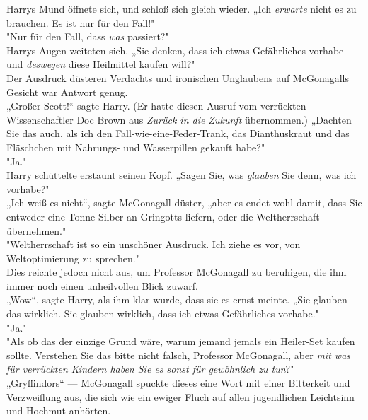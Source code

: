 {Harrys Mund öffnete sich, und schloß sich gleich wieder. „Ich \emph{erwarte} nicht es zu brauchen. Es ist nur für den Fall!"\\ "Nur für den Fall, dass \emph{was} passiert?"\\ Harrys Augen weiteten sich. „Sie denken, dass ich etwas Gefährliches vorhabe und \emph{deswegen} diese Heilmittel kaufen will?"\\ Der Ausdruck düsteren Verdachts und ironischen Unglaubens auf McGonagalls Gesicht war Antwort genug.\\ „Großer Scott!“ sagte Harry. (Er hatte diesen Ausruf vom verrückten Wissenschaftler Doc Brown aus \emph{Zurück in die Zukunft} übernommen.) „Dachten Sie das auch, als ich den Fall-wie-eine-Feder-Trank, das Dianthuskraut und das Fläschchen mit Nahrungs- und Wasserpillen gekauft habe?"\\ "Ja."\\ Harry schüttelte erstaunt seinen Kopf. „Sagen Sie, was \emph{glauben} Sie denn, was ich vorhabe?"\\ „Ich weiß es nicht“, sagte McGonagall düster, „aber es endet wohl damit, dass Sie entweder eine Tonne Silber an Gringotts liefern, oder die Weltherrschaft übernehmen."\\ "Weltherrschaft ist so ein unschöner Ausdruck. Ich ziehe es vor, von Weltoptimierung zu sprechen."\\ Dies reichte jedoch nicht aus, um Professor McGonagall zu beruhigen, die ihm immer noch einen unheilvollen Blick zuwarf.\\ „Wow“, sagte Harry, als ihm klar wurde, dass sie es ernst meinte. „Sie glauben das wirklich. Sie glauben wirklich, dass ich etwas Gefährliches vorhabe."\\ "Ja."\\ "Als ob das der einzige Grund wäre, warum jemand jemals ein Heiler-Set kaufen sollte. Verstehen Sie das bitte nicht falsch, Professor McGonagall, aber \emph{mit was für verrückten Kindern haben Sie es sonst für gewöhnlich zu tun}?"\\ „Gryffindors“ --- McGonagall spuckte dieses eine Wort mit einer Bitterkeit und Verzweiflung aus, die sich wie ein ewiger Fluch auf allen jugendlichen Leichtsinn und Hochmut anhörten.

}
